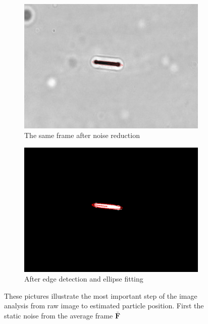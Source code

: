 \begin{figure}[H]
\begin{subfigure}[3a]{0.4\textwidth}
\includegraphics[width=\textwidth]{figures/method/static2.png}
\caption{The same frame after noise reduction}\label{fig:fixedFrame}
\end{subfigure}\hspace{1em}%
\begin{subfigure}[3a]{0.4\textwidth}
\includegraphics[width=\textwidth]{figures/method/edge.png}
\caption{After edge detection and ellipse fitting}\label{fig:edgeFrame}
\end{subfigure}

\caption{These pictures illustrate the most important step of the image analysis from raw image to estimated particle position. First the static noise from the average frame $\bar{\mathbf{F}}$}
\label{fig:detection}
\end{figure}

